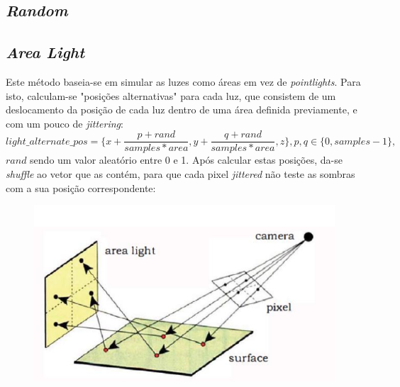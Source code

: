 \documentclass{article}
\begin{document}
        \subsection*{\textit{Random}}
            \par

        \subsection*{\textit{Area Light}}
            \par
            Este método baseia-se em simular as luzes como áreas em vez de \textit{pointlights}. Para isto, calculam-se "posições alternativas" para cada luz, que consistem de um deslocamento da posição de cada luz dentro de uma área definida previamente, e com um pouco de \textit{jittering}:
            $$ light\_alternate\_pos = \{x + \frac{p + rand}{samples * area}, y + \frac{q + rand}{samples * area}, z\}, p,q \in \{0, samples - 1\},$$
            $rand$ sendo um valor aleatório entre 0 e 1. Após calcular estas posições, da-se \textit{shuffle} ao vetor que as contém, para que cada pixel \textit{jittered} não teste as sombras com a sua posição correspondente:
            \begin{figure}[h]
                \centering
                \includegraphics[scale=0.5]{area} 
            \end{figure}
\end{document}
